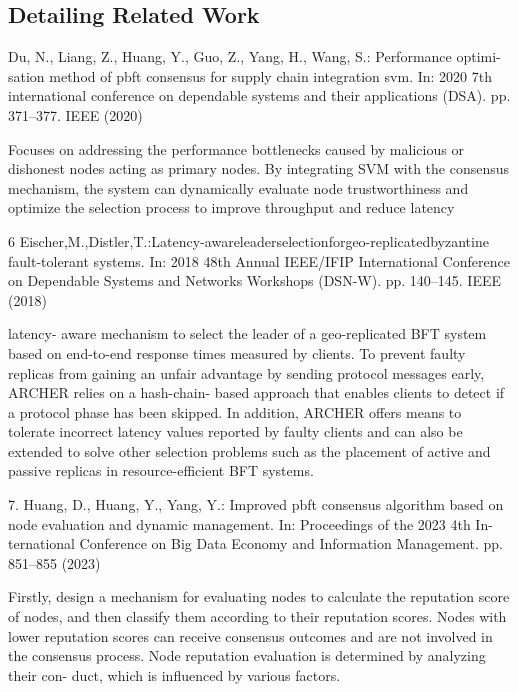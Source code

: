 
\subsection{Detailing Related Work}



\cite{du2020performance} Du, N., Liang, Z., Huang, Y., Guo, Z., Yang, H., Wang, S.: Performance optimi-
sation method of pbft consensus for supply chain integration svm. In: 2020 7th
international conference on dependable systems and their applications (DSA). pp.
371–377. IEEE (2020)

Focuses on addressing the performance bottlenecks caused by malicious or dishonest nodes acting as primary nodes.
By integrating SVM with the consensus mechanism, the system can dynamically evaluate node trustworthiness and 
optimize the selection process to improve throughput and reduce latency









6 Eischer,M.,Distler,T.:Latency-awareleaderselectionforgeo-replicatedbyzantine
fault-tolerant systems. In: 2018 48th Annual IEEE/IFIP International Conference
on Dependable Systems and Networks Workshops (DSN-W). pp. 140–145. IEEE
(2018)

latency-
aware mechanism to select the leader of a geo-replicated BFT
system based on end-to-end response times measured by clients.
To prevent faulty replicas from gaining an unfair advantage by
sending protocol messages early, ARCHER relies on a hash-chain-
based approach that enables clients to detect if a protocol phase
has been skipped. In addition, ARCHER offers means to tolerate
incorrect latency values reported by faulty clients and can also be
extended to solve other selection problems such as the placement
of active and passive replicas in resource-efficient BFT systems.








7. Huang, D., Huang, Y., Yang, Y.: Improved pbft consensus algorithm based on
node evaluation and dynamic management. In: Proceedings of the 2023 4th In-
ternational Conference on Big Data Economy and Information Management. pp.
851–855 (2023)

Firstly, design a mechanism for evaluating nodes
to calculate the reputation score of nodes, and then classify them
according to their reputation scores. Nodes with lower reputation
scores can receive consensus outcomes and are not involved in
the consensus process.
Node reputation evaluation is determined by analyzing their con-
duct, which is influenced by various factors.









